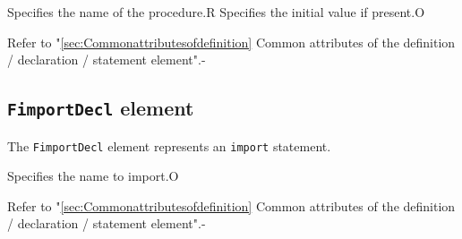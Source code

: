 \begin{XcodeMLChildElements}
{Specifies the name of the procedure.}{R}
{Specifies the initial value if present.}{O}
\end{XcodeMLChildElements}

\begin{XcodeMLAttributes}
{Refer to "\ref{sec:Commonattributesofdefinition} Common attributes of the definition / declaration / statement element".}{-}
\end{XcodeMLAttributes}


\subsection{ {\tt FimportDecl} element}

The {\tt FimportDecl} element represents an {\tt import} statement.


\begin{XcodeMLChildElements}
{Specifies the name to import.}{O}
\end{XcodeMLChildElements}

\begin{XcodeMLAttributes}
{Refer to "\ref{sec:Commonattributesofdefinition} Common attributes of the definition / declaration / statement element".}{-}
\end{XcodeMLAttributes}
